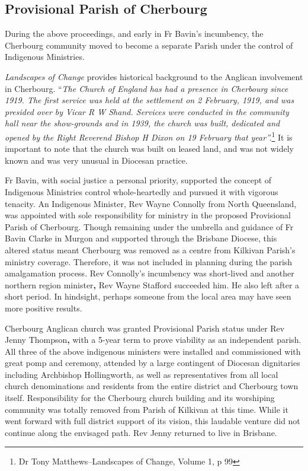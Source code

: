 \subsection{Provisional Parish of Cherbourg}



During the above proceedings, and early in Fr Bavin's incumbency, the Cherbourg community moved to become a separate Parish under the control of Indigenous Ministries.



\emph{Landscapes of Change} provides historical background to the Anglican involvement in Cherbourg. ``\emph{The Church of England has had a presence in Cherbourg since 1919. The first service was held at the settlement on 2 February, 1919, and was presided over by Vicar R W Shand. Services were conducted in the community hall near the show-grounds and in 1939, the church was built, dedicated and opened by the Right Reverend Bishop H Dixon on 19 February that year''.}\footnote{Dr Tony Matthews--Landscapes of Change, Volume 1, p 99} It is important to note that the church was built on leased land, and was not widely known and was very unusual in Diocesan practice.


Fr Bavin, with social justice a personal priority, supported the concept of Indigenous Ministries control whole-heartedly and pursued it with vigorous tenacity. An Indigenous Minister, Rev Wayne Connolly from North Queensland, was appointed with sole responsibility for ministry in the proposed Provisional Parish of Cherbourg. Though remaining under the umbrella and guidance of Fr Bavin Clarke in Murgon and supported through the Brisbane Diocese, this altered status meant Cherbourg was removed as a centre from Kilkivan Parish's ministry coverage. Therefore, it was not included in planning during the parish amalgamation process. Rev Connolly's incumbency was short-lived and another northern region minister\textbf{,} Rev Wayne Stafford succeeded him. He also left after a short period. In hindsight, perhaps someone from the local area may have seen more positive results.



Cherbourg Anglican church was granted Provisional Parish status under Rev Jenny Thompson\textbf{,} with a 5-year term to prove viability as an independent parish. All three of the above indigenous ministers were installed and commissioned with great pomp and ceremony, attended by a large contingent of Diocesan dignitaries including Archbishop Hollingworth, as well as representatives from all local church denominations and residents from the entire district and Cherbourg town itself. Responsibility for the Cherbourg church building and its worshiping community was totally removed from Parish of Kilkivan at this time. While it went forward with full district support of its vision, this laudable venture did not continue along the envisaged path. Rev Jenny returned to live in Brisbane.



